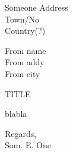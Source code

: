 \documentclass[12pt,a4paper]{letter}
\date{DD. month YYYY}
\begin{document}
\begin{letter}{Someone
Address\\
Town/No\\
Country(?)}
					
From name \\
From addy \\
From city\\


\bigskip

\opening{TITLE}
blabla

\bigskip

\closing{Regards, \\
Som. E. One}

\end{letter}
\end{document}
